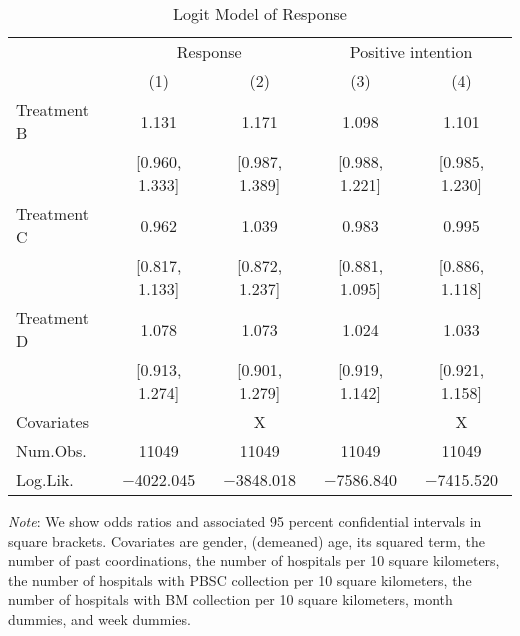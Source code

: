 \documentclass[12pt, a4paper]{article}
\begin{document}
\begin{table}[H]

\caption{\label{tab:reply-logit}Logit Model of Response}
\centering
\fontsize{9}{11}\selectfont
\begin{threeparttable}
\begin{tabular}[t]{lcccc}
\toprule
\multicolumn{1}{c}{ } & \multicolumn{2}{c}{Response} & \multicolumn{2}{c}{Positive intention} \\
\cmidrule(l{3pt}r{3pt}){2-3} \cmidrule(l{3pt}r{3pt}){4-5}
  & (1) & (2) & (3) & (4)\\
\midrule
Treatment B & \num{1.131} & \num{1.171} & \num{1.098} & \num{1.101}\\
 & {}[\num{0.960}, \num{1.333}] & {}[\num{0.987}, \num{1.389}] & {}[\num{0.988}, \num{1.221}] & {}[\num{0.985}, \num{1.230}]\\
Treatment C & \num{0.962} & \num{1.039} & \num{0.983} & \num{0.995}\\
 & {}[\num{0.817}, \num{1.133}] & {}[\num{0.872}, \num{1.237}] & {}[\num{0.881}, \num{1.095}] & {}[\num{0.886}, \num{1.118}]\\
Treatment D & \num{1.078} & \num{1.073} & \num{1.024} & \num{1.033}\\
 & {}[\num{0.913}, \num{1.274}] & {}[\num{0.901}, \num{1.279}] & {}[\num{0.919}, \num{1.142}] & {}[\num{0.921}, \num{1.158}]\\
\midrule
Covariates &  & X &  & X\\
Num.Obs. & \num{11049} & \num{11049} & \num{11049} & \num{11049}\\
Log.Lik. & \num{-4022.045} & \num{-3848.018} & \num{-7586.840} & \num{-7415.520}\\
\bottomrule
\end{tabular}
\begin{tablenotes}
\item \emph{Note}: We show odds ratios and associated 95 percent confidential intervals in square brackets. Covariates are gender, (demeaned) age, its squared term, the number of past coordinations, the number of hospitals per 10 square kilometers, the number of hospitals with PBSC collection per 10 square kilometers, the number of hospitals with BM collection per 10 square kilometers, month dummies, and week dummies.
\end{tablenotes}
\end{threeparttable}
\end{table}
\end{document}
